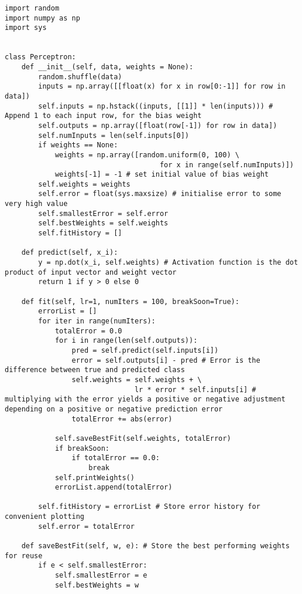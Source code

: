 \documentclass[11pt,a4paper]{article}
\begin{document}
\newpage
\appendix

\begin{listing}[htbp]
\begin{verbatim}
import random
import numpy as np
import sys


class Perceptron:
    def __init__(self, data, weights = None):
        random.shuffle(data)
        inputs = np.array([[float(x) for x in row[0:-1]] for row in data])
        self.inputs = np.hstack((inputs, [[1]] * len(inputs))) # Append 1 to each input row, for the bias weight
        self.outputs = np.array([float(row[-1]) for row in data])
        self.numInputs = len(self.inputs[0])
        if weights == None:
            weights = np.array([random.uniform(0, 100) \
                                     for x in range(self.numInputs)])
            weights[-1] = -1 # set initial value of bias weight
        self.weights = weights
        self.error = float(sys.maxsize) # initialise error to some very high value
        self.smallestError = self.error
        self.bestWeights = self.weights
        self.fitHistory = []

    def predict(self, x_i):
        y = np.dot(x_i, self.weights) # Activation function is the dot product of input vector and weight vector
        return 1 if y > 0 else 0

    def fit(self, lr=1, numIters = 100, breakSoon=True):
        errorList = []
        for iter in range(numIters):
            totalError = 0.0
            for i in range(len(self.outputs)):
                pred = self.predict(self.inputs[i])
                error = self.outputs[i] - pred # Error is the difference between true and predicted class
                self.weights = self.weights + \
                               lr * error * self.inputs[i] # multiplying with the error yields a positive or negative adjustment depending on a positive or negative prediction error
                totalError += abs(error)
            
            self.saveBestFit(self.weights, totalError)
            if breakSoon:
                if totalError == 0.0:
                    break
            self.printWeights()
            errorList.append(totalError)

        self.fitHistory = errorList # Store error history for convenient plotting
        self.error = totalError
        
    def saveBestFit(self, w, e): # Store the best performing weights for reuse
        if e < self.smallestError:
            self.smallestError = e
            self.bestWeights = w


\end{verbatim}
\end{listing}
\end{document}
